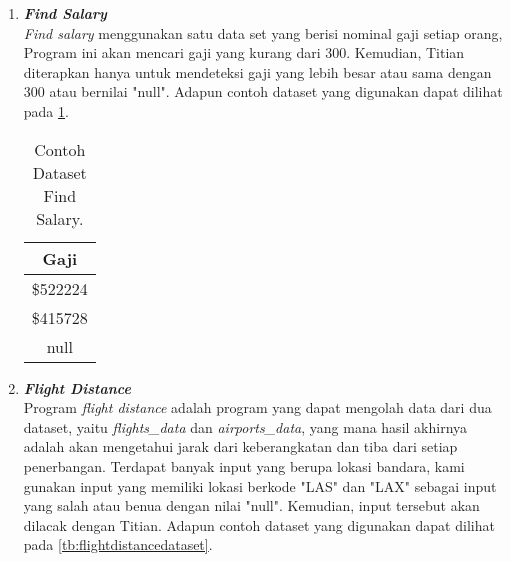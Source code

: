 \begin{enumerate}
      \item \emph{\textbf{Find Salary}} \\
            \emph{Find salary} menggunakan satu data set yang berisi nominal gaji setiap orang, Program ini akan mencari gaji yang kurang dari 300. Kemudian, Titian diterapkan hanya untuk mendeteksi gaji yang lebih besar atau sama dengan 300 atau bernilai "null".
            Adapun contoh dataset yang digunakan dapat 
            dilihat pada \ref{tb:findsalarydataset}.

            \begin{longtable}{|c|}
                  \caption{Contoh Dataset Find Salary.}
                  \label{tb:findsalarydataset} \\
                  \hline
                  \rowcolor[HTML]{C0C0C0}
                  \textbf{Gaji} \\
                  \hline
                  \$522224 \\
                  \$415728 \\
                  null \\
                  \hline
            \end{longtable}

      \item \emph{\textbf{Flight Distance}} \\
            Program \emph{flight distance} adalah program yang dapat mengolah data dari dua dataset, yaitu \emph{flights\_data} dan \emph{airports\_data}, yang mana hasil akhirnya adalah akan mengetahui jarak dari keberangkatan dan tiba dari setiap penerbangan. 
            Terdapat banyak input yang berupa lokasi bandara, kami gunakan input yang memiliki lokasi berkode "LAS" dan "LAX" sebagai input yang salah atau benua dengan nilai "null". Kemudian, input tersebut akan dilacak dengan Titian.
            Adapun contoh dataset yang digunakan dapat 
            dilihat pada \ref{tb:flightdistancedataset}.


\end{enumerate}
